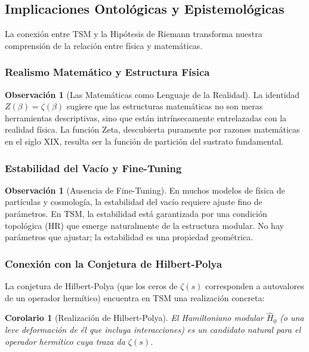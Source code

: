 \documentclass[11pt, a4paper]{article}
\theoremstyle{plain}
\newtheorem{corolario}[teorema]{Corolario}
\theoremstyle{definition}
\newtheorem{observacion}[teorema]{Observación}
\begin{document}
\subsection{Implicaciones Ontológicas y Epistemológicas}

La conexión entre TSM y la Hipótesis de Riemann transforma nuestra comprensión de la relación entre física y matemáticas.

\subsubsection{Realismo Matemático y Estructura Física}

\begin{observacion}[Las Matemáticas como Lenguaje de la Realidad]
La identidad $Z(\beta) = \zeta(\beta)$ sugiere que las estructuras matemáticas no son meras herramientas descriptivas, sino que están intrínsecamente entrelazadas con la realidad física. La función Zeta, descubierta puramente por razones matemáticas en el siglo XIX, resulta ser la función de partición del sustrato fundamental.
\end{observacion}

\subsubsection{Estabilidad del Vacío y Fine-Tuning}

\begin{observacion}[Ausencia de Fine-Tuning]
En muchos modelos de física de partículas y cosmología, la estabilidad del vacío requiere ajuste fino de parámetros. En TSM, la estabilidad está garantizada por una condición topológica (HR) que emerge naturalmente de la estructura modular. No hay parámetros que ajustar; la estabilidad es una propiedad geométrica.
\end{observacion}

\subsubsection{Conexión con la Conjetura de Hilbert-Polya}

La conjetura de Hilbert-Polya (que los ceros de $\zeta(s)$ corresponden a autovalores de un operador hermítico) encuentra en TSM una realización concreta:

\begin{corolario}[Realización de Hilbert-Polya]
El Hamiltoniano modular $\hat{H}_0$ (o una leve deformación de él que incluya interacciones) es un candidato natural para el operador hermítico cuya traza da $\zeta(s)$.
\end{corolario}
\end{document}
